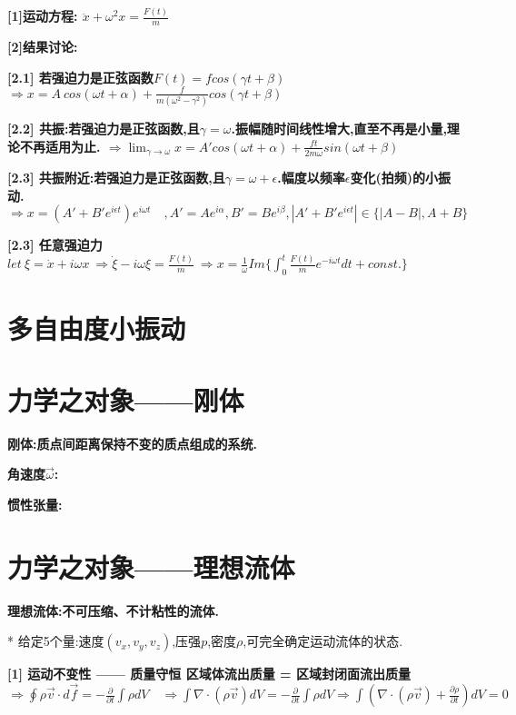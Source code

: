             \bf{[1]运动方程}:
                $\ddot x + \omega^2 x = \frac{F(t)}{m}$
            
            \bf{[2]结果讨论}:
            
            \bf{[2.1]} 若强迫力是正弦函数$F(t) = f cos(\gamma t + \beta)$
                $\Rightarrow x = A\ cos(\omega t + \alpha) + \frac{f}{m(\omega^2 - \gamma^2)} cos(\gamma t + \beta)$
                
            \bf{[2.2]} \bf{共振}:若强迫力是正弦函数,且$\gamma = \omega$.\quad 振幅随时间线性增大,直至不再是小量,理论不再适用为止.
            $\Rightarrow \lim_{\gamma \to \omega}x = A'cos(\omega t + \alpha) + \frac{f t}{2m\omega} sin(\omega t + \beta)$
            
            \bf{[2.3]} 共振附近:若强迫力是正弦函数,且$\gamma = \omega + \epsilon$.\quad 幅度以频率$\epsilon$变化(\bf{拍频})的小振动.
            $\Rightarrow x = (A' + B' e^{i\epsilon t})e^{i\omega t} \quad ,A' = Ae^{i\alpha},B' = Be^{i\beta},|A' + B' e^{i\epsilon t}| \in \{|A-B|,A+B\} $
            
            \bf{[2.3]} 任意强迫力
            $let\ \xi = \dot x + i\omega x\ \Rightarrow \dot \xi - i\omega \xi = \frac{F(t)}{m}  \ \Rightarrow x = \frac{1}{\omega}Im\{\int_0^t \frac{F(t)}{m}e^{-i\omega t}dt + const.\}$


        \section{多自由度小振动}


    \section{力学之对象——刚体}
        \bf{刚体}:质点间距离保持不变的质点组成的系统.
        
        \bf{角速度$\vec \omega$}:
        
        \bf{惯性张量}:
    
    
    
    \section{力学之对象——理想流体}
        \bf{理想流体}:不可压缩、不计粘性的流体.
        
        * 给定5个量:速度$(v_x,v_y,v_z)$,压强$p$,密度$\rho$,可完全确定运动流体的状态.
        
        \bf{[1] 运动不变性 —— 质量守恒}
            区域体流出质量 = 区域封闭面流出质量
            $\Rightarrow \oint \rho \vec v \cdot d \vec f = -\frac{\partial}{\partial t}\int \rho dV \quad \Rightarrow \int \nabla \cdot (\rho \vec v) dV  = -\frac{\partial}{\partial t}\int \rho dV \Rightarrow  \int (\nabla \cdot (\rho \vec v) + \frac{\partial \rho}{\partial t}) dV  = 0$
        
